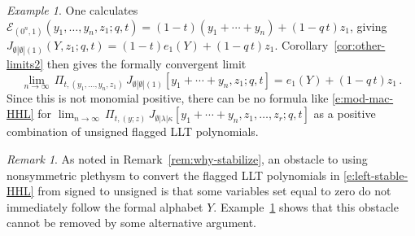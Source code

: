 \documentclass[12pt]{amsart}
\theoremstyle{definition}
\theoremstyle{remark}
\newtheorem{example}[thm]{Example}
\newtheorem{remark}[thm]{Remark}
\newcommand{\Ecal}{{\mathcal E}}
\newcommand{\Jns}{J}           %
\begin{document}
\begin{example}\label{ex:left-is-bad}
One calculates $\Ecal _{(0^{n},1)}(y_{1},\ldots,y_{n},z_{1};q,t) =
(1-t)(y_{1}+\cdots +y_{n})+(1-q\, t) z_{1}$, giving $\Jns _{\emptyset
|\emptyset |(1)}(Y,z_{1};q,t) = (1-t)e_{1}(Y)+(1-q\, t)z_{1}$.
Corollary~\ref{cor:other-limits2}
then gives the formally convergent limit
\begin{equation}\label{e:left-is-bad}
\lim_{n\rightarrow \infty }\, \Pi _{t,(y_{1},\ldots,y_{n},z_{1})} \,
\Jns _{\emptyset |\emptyset |(1)}[y_{1}+\cdots +y_{n}, z_{1}; q,t] =
e_{1}(Y) +(1-q\, t) z_{1}\, .
\end{equation}
Since this is not monomial positive, there can be no formula like
\eqref{e:mod-mac-HHL} for $\lim_{n\rightarrow \infty } \, \Pi
_{t,(y;z)}\, \Jns _{\emptyset |\lambda |\kappa }[y_{1}+\cdots +y_{n},
z_{1},\ldots,z_{r}; q,t]$ as a positive combination of unsigned
flagged LLT polynomials.
\end{example}

\begin{remark}\label{rem:obstacle}
As noted in Remark~\ref{rem:why-stabilize}, an obstacle to using
nonsymmetric plethysm to convert the flagged LLT polynomials in
\eqref{e:left-stable-HHL} from signed to unsigned is that some
variables set equal to zero do not immediately follow the formal
alphabet $Y$.  Example~\ref{ex:left-is-bad} shows that this obstacle
cannot be removed by some alternative argument.
\end{remark}





\end{document}
